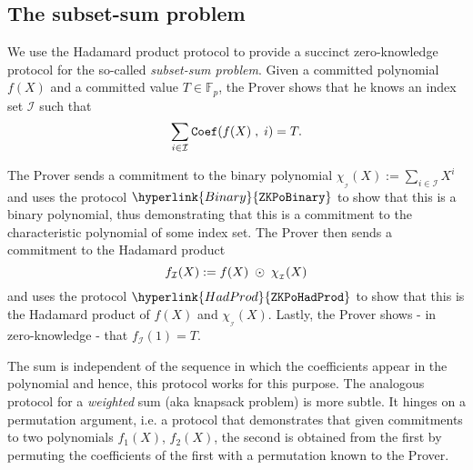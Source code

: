 \documentclass[11pt, lettersize, notitlepage, leqno, footskip=0.6cm]{article}
\newcommand{\bFp}{\mathbb{F}_p}
\newcommand{\wti}{\widetilde}
\newcommand{\mc}{\mathcal}
\newcommand{\mP}{\mc{P}}
\newcommand{\V}{\mc{V}}
\newcommand{\vs}{\vspace{-0.15cm}}
\numberwithin{equation}{section}
\begin{document}
\begin{comment}
\item $\mP$ computes the polynomial \vs $$f^{\vee}_{\mc{I}}(X):= \sum\limits_{i\in \mc{I}} {\tt{Coef}}(f(X)\;,\;i)^{-1}\cdot X^i    \vs $$ and sends the element \vs $$a^{\vee}:= g_1^{f^{\vee}(s)}\vs $$ along with a proof for $\hyperlink{HadProd}{\tt{ZKPoHadProd}}[g_1,\;(a,\;a^{\vee}),\;\wti{a}_{\tt{nz}}]$

\item The Verifier $\V$ verifies the $\hyperlink{Binary}{\tt{ZKPoBinary}}$, the $\hyperlink{HadProd}{\tt{ZKPoHadProd}}$s and accepts if and only if they are all valid. \qed \end{enumerate} \end{mdframed}





\bigskip


\end{comment}


\subsection{\fontsize{11}{11}\selectfont The subset-sum problem}

We use the Hadamard product protocol to provide a succinct zero-knowledge protocol for the so-called \textit{subset-sum problem}. Given a committed polynomial $f(X)$ and a committed value $T\in\bFp$, the Prover shows that he knows an index set $\mc{I}$ such that \vs $$ \sum\limits_{i\in\mc{I}} {\tt{Coef}}(f(X)\;,\;i) = T.\vs $$ 

The Prover sends a commitment to the binary polynomial $\chi_{_{\mc{I}}}(X):= \sum_{i\in\mc{I}} X^i$ and uses the protocol $\hyperlink{Binary}{\tt{ZKPoBinary}}$ to show that this is a binary polynomial, thus demonstrating that this is a commitment to the characteristic polynomial of some index set. The Prover then sends a commitment to the Hadamard product \vs $$f_{\mc{I}}(X):= f(X)\;\odot\; \chi_{_{\mc{I}}}(X)\vs $$ and uses the protocol $\hyperlink{HadProd}{\tt{ZKPoHadProd}}$ to show that this is the Hadamard product of $f(X)$ and $\chi_{_{\mc{I}}}(X)$. Lastly, the Prover shows - in zero-knowledge - that $f_{\mc{I}}(1) = T$.

The sum is independent of the sequence in which the coefficients appear in the polynomial and hence, this protocol works for this purpose. The analogous protocol for a \textit{weighted} sum (aka knapsack problem) is more subtle. It hinges on a permutation argument, i.e. a protocol that demonstrates that given commitments to two polynomials $f_1(X)$, $f_2(X)$, the second is obtained from the first by permuting the coefficients of the first with a permutation known to the Prover. 
\end{document}
